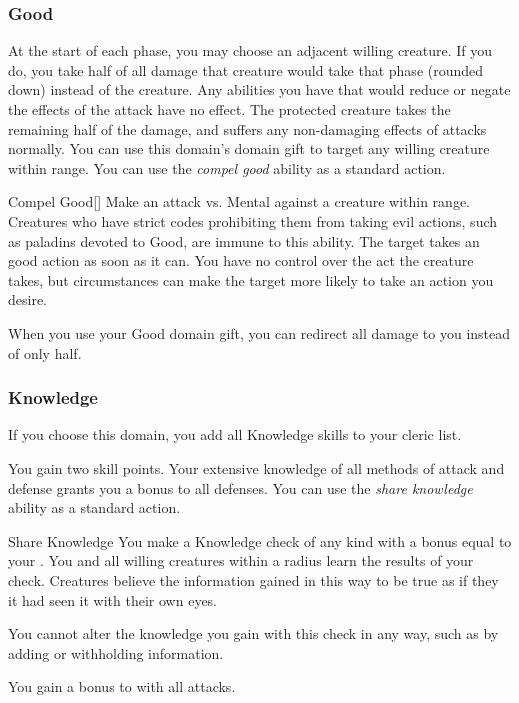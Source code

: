        \subsubsection{Good}
             At the start of each phase, you may choose an adjacent willing creature.
            If you do, you take half of all damage that creature would take that phase (rounded down) instead of the creature.
            Any abilities you have that would reduce or negate the effects of the attack have no effect.
            The protected creature takes the remaining half of the damage, and suffers any non-damaging effects of attacks normally.
             You can use this domain's domain gift to target any willing creature within \rngclose range.
             You can use the \textit{compel good} ability as a standard action.
            \begin{apability}{Compel Good}[]
                Make an attack vs. Mental against a creature within \rngmed range.
                Creatures who have strict codes prohibiting them from taking evil actions, such as paladins devoted to Good, are immune to this ability.
                \hit The target takes an good action as soon as it can.
                You have no control over the act the creature takes, but circumstances can make the target more likely to take an action you desire.
            \end{apability}
             When you use your Good domain gift, you can redirect all damage to you instead of only half.

        \subsubsection{Knowledge}
            If you choose this domain, you add all Knowledge skills to your cleric  list.

             You gain two skill points.
             Your extensive knowledge of all methods of attack and defense grants you a  bonus to all defenses.
             You can use the \textit{share knowledge} ability as a standard action.
            \begin{apability}{Share Knowledge}
                You make a Knowledge check of any kind with a bonus equal to your .
                You and all willing creatures within a \arealarge radius learn the results of your check.
                Creatures believe the information gained in this way to be true as if they it had seen it with their own eyes.

                You cannot alter the knowledge you gain with this check in any way, such as by adding or withholding information.
            \end{apability}
             You gain a  bonus to  with all attacks.

